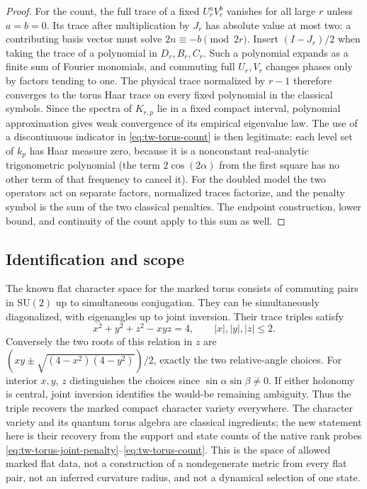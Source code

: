 \begin{proof}
For the count, the full trace of a fixed \(U_r^aV_r^b\) vanishes for
all large \(r\) unless \(a=b=0\).  Its trace after multiplication
by \(J_r\) has absolute value at most two: a contributing basis vector
must solve \(2n\equiv-b\pmod{2r}\).  Insert \((I-J_r)/2\) when taking
the trace of a polynomial in \(D_r,B_r,C_r\).
Such a polynomial expands as a finite sum of Fourier monomials,
and commuting full \(U_r,V_r\) changes phases only by factors tending
to one.  The physical trace normalized by \(r-1\) therefore converges
to the torus Haar trace on every fixed polynomial in the classical
symbols.  Since the spectra of \(K_{r,p}\) lie in a fixed compact
interval, polynomial approximation gives weak convergence of its
empirical eigenvalue law.  The use of a discontinuous indicator in
\eqref{eq:tw-torus-count} is then legitimate: each level set of
\(k_p\) has Haar measure zero, because it is a nonconstant real-analytic
trigonometric polynomial (the term \(2\cos(2\alpha)\) from the first
square has no other term of that frequency to cancel it).
For the doubled model the two operators act on separate factors,
normalized traces factorize, and the penalty symbol is the sum of
the two classical penalties.  The endpoint construction, lower bound,
and continuity of the count apply to this sum as well.
\end{proof}

\subsection{Identification and scope}

The known flat character space for the marked torus consists of
commuting pairs in \(\mathrm{SU}(2)\) up to simultaneous conjugation.
They can be simultaneously diagonalized, with eigenangles up to joint
inversion.  Their trace triples satisfy
\[
 x^2+y^2+z^2-xyz=4,\qquad |x|,|y|,|z|\leq2.
\]
Conversely the two roots of this relation in \(z\) are
\((xy\pm\sqrt{(4-x^2)(4-y^2)})/2\), exactly the two relative-angle
choices.  For interior \(x,y\), \(z\) distinguishes the choices
since \(\sin\alpha\sin\beta\ne0\).  If either holonomy is central,
joint inversion identifies the would-be remaining ambiguity.
Thus the triple recovers the marked compact character variety everywhere.
The character variety and its quantum torus algebra are classical
ingredients; the new statement here is their recovery from the support
and state counts of the native rank probes
\eqref{eq:tw-torus-joint-penalty}--\eqref{eq:tw-torus-count}.
This is the space of allowed marked flat data, not a construction of
a nondegenerate metric from every flat pair, not an inferred curvature
radius, and not a dynamical selection of one state.

